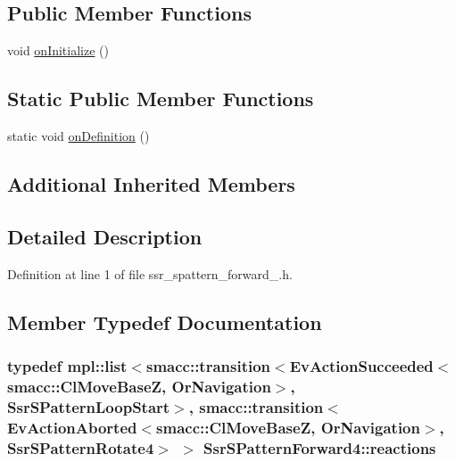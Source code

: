 \subsection*{Public Member Functions}
\begin{DoxyCompactItemize}
\item 
void \hyperlink{structSsrSPatternForward4_ad0ad8bfc383496145a5e535031286f73}{on\+Initialize} ()
\end{DoxyCompactItemize}
\subsection*{Static Public Member Functions}
\begin{DoxyCompactItemize}
\item 
static void \hyperlink{structSsrSPatternForward4_a6d79c39c58f9838e0d15ef954f7678ff}{on\+Definition} ()
\end{DoxyCompactItemize}
\subsection*{Additional Inherited Members}


\subsection{Detailed Description}


Definition at line 1 of file ssr\+\_\+spattern\+\_\+forward\+\_.\+h.



\subsection{Member Typedef Documentation}
\subsubsection[{\texorpdfstring{reactions}{reactions}}]{\setlength{\rightskip}{0pt plus 5cm}typedef mpl\+::list$<${\bf smacc\+::transition}$<$Ev\+Action\+Succeeded$<${\bf smacc\+::\+Cl\+Move\+BaseZ}, Or\+Navigation$>$, {\bf Ssr\+S\+Pattern\+Loop\+Start}$>$, {\bf smacc\+::transition}$<$Ev\+Action\+Aborted$<${\bf smacc\+::\+Cl\+Move\+BaseZ}, Or\+Navigation$>$, {\bf Ssr\+S\+Pattern\+Rotate4}$>$ $>$ {\bf Ssr\+S\+Pattern\+Forward4\+::reactions}}\hypertarget{structSsrSPatternForward4_adbf672343fe9065db27f75352f6db219}{}\label{structSsrSPatternForward4_adbf672343fe9065db27f75352f6db219}


